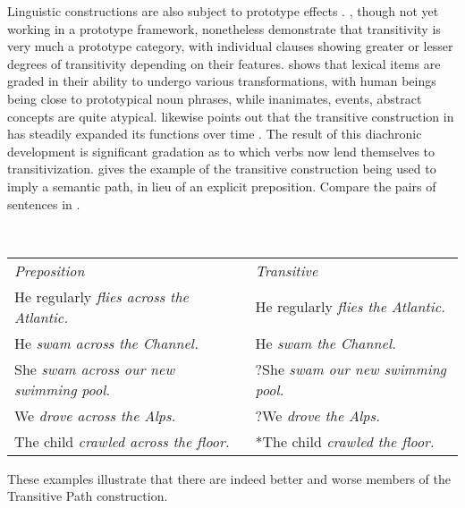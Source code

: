 Linguistic constructions are also subject to prototype effects \parencite[Ch.~12]{Taylor2003}. \textcite{HopperThompson1980}, though not yet working in a prototype framework, nonetheless demonstrate that transitivity is very much a prototype category, with individual clauses showing greater or lesser degrees of transitivity depending on their features. \textcite{Ross1972} shows that lexical items are graded in their ability to undergo various transformations, with human beings being close to prototypical noun phrases, while inanimates, events, abstract concepts are quite atypical. \textcite[§12.5]{Taylor2003} likewise points out that the transitive construction in  has steadily expanded its functions over time . The result of this diachronic development is significant gradation as to which verbs now lend themselves to transitivization. \textcite[236]{Taylor2003} gives the example of the transitive construction being used to imply a semantic path, in lieu of an explicit preposition. Compare the pairs of  sentences in .

\begin{exe}
  \ex\label{ex:2.21}
  \hspace{0.5em}\\
  \begin{tabular}[t]{ l l }
    \textit{Preposition}                         & \textit{Transitive}\\
    He regularly \em{flies across} the Atlantic. & He regularly \em{flies} the Atlantic.\\
    He \em{swam across} the Channel.             & He \em{swam} the Channel.\\
    She \em{swam across} our new swimming pool.  & ?She \em{swam} our new swimming pool.\\
    We \em{drove across} the Alps.               & ?We \em{drove} the Alps.\\
    The child \em{crawled across} the floor.     & *The child \em{crawled} the floor.\\
  \end{tabular}
  \vspace{0.5em}
\end{exe}

\noindent These examples illustrate that there are indeed better and worse members of the  Transitive Path construction.

